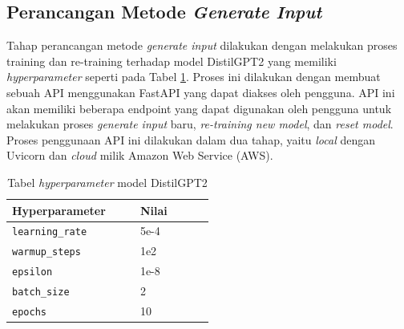   \subsection{Perancangan Metode \emph{Generate Input}}
  \label{subsec:perancanganmetodegenerateinput}

Tahap perancangan metode \emph{generate input} dilakukan dengan 
melakukan proses training dan re-training terhadap model DistilGPT2 
yang memiliki \emph{hyperparameter} seperti pada Tabel \ref{tab:hyperparameter}. 
Proses ini dilakukan dengan membuat sebuah API menggunakan FastAPI 
yang dapat diakses oleh pengguna. API ini akan memiliki beberapa 
endpoint yang dapat digunakan oleh pengguna untuk melakukan proses 
\emph{generate input} baru, \emph{re-training new model}, dan \emph{reset model}. 
Proses penggunaan API ini dilakukan dalam dua tahap, yaitu \emph{local} dengan 
Uvicorn 
dan \emph{cloud} milik Amazon Web Service (AWS). 


\begin{table}[H]
  \centering
  \caption{Tabel \emph{hyperparameter} model DistilGPT2}
  \begin{tabular}{|p{0.25\linewidth}|p{0.25\linewidth}|}
    \hline
    \textbf{Hyperparameter} & \textbf{Nilai} \\
    \hline
    \raggedright \texttt{learning\_rate} & 5e-4 \\
    \hline
    \raggedright \texttt{warmup\_steps} & 1e2 \\
    \hline
    \raggedright \texttt{epsilon} & 1e-8 \\
    \hline
    \raggedright \texttt{batch\_size} & 2 \\
    \hline
    \raggedright \texttt{epochs} & 10 \\
    \hline
  \end{tabular}
  
  \label{tab:hyperparameter}
\end{table}



